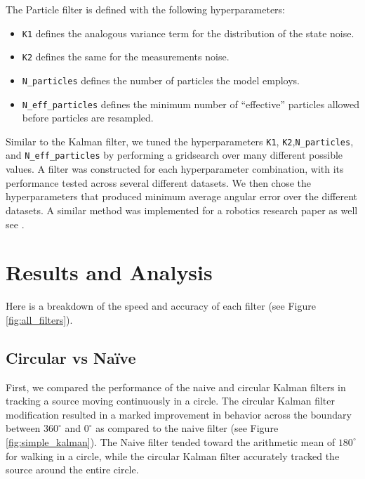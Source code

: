 \documentclass[11pt]{amsart}
\begin{document}
The Particle filter is defined with the following hyperparameters: 
\begin{itemize}
    \item \lstinline{K1} defines the analogous variance term for the distribution of the state noise.
    \item \lstinline{K2} defines the same for the measurements noise.
    \item \lstinline{N_particles} defines the number of particles the model employs.
    \item \lstinline{N_eff_particles} defines the minimum number of “effective” particles allowed before particles are resampled.
\end{itemize}

Similar to the Kalman filter, we tuned the hyperparameters \lstinline{K1},
\lstinline{K2},\newline \lstinline{N_particles}, and \lstinline{N_eff_particles} by performing a
gridsearch over many different possible values. A filter was constructed for each hyperparameter
combination, with its performance tested across several different datasets. We then chose the
hyperparameters that produced minimum average angular error over the different datasets. A similar
method was implemented for a robotics research paper as well see \cite{Oops}.

\section{Results and Analysis}
Here is a breakdown of the speed and accuracy of each filter (see Figure \ref{fig:all_filters}).

\subsection{Circular vs Naïve}
First, we compared the performance of the naive and circular Kalman filters in tracking a source moving continuously in a circle. The circular Kalman filter modification resulted in a marked improvement in behavior across the boundary between $360^{\circ}$ and $0^{\circ}$ as 
compared to the naive filter (see Figure \ref{fig:simple_kalman}). The Naive filter tended toward the arithmetic mean of $180^{\circ}$ for walking in a circle, while the circular Kalman filter accurately tracked the source around the entire circle.
\end{document}
